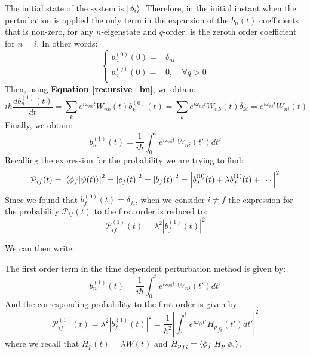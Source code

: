 The initial state of the system is $\ket{\phi_i}$. Therefore, in the initial instant when the perturbation is applied the only term in the expansion of the $b_n(t)$ coefficients that is non-zero, for any $n$-eigenstate and $q$-order, is the zeroth order coefficient for $n = i$. In other words:
\begin{equation}
    \left\{
    \begin{matrix}
        b_n^{(0)}(0) =& \delta_{ni}&\\
        b_n^{(q)}(0) =& 0,& \forall q > 0 \\
    \end{matrix}\right.
\end{equation}
Then, using \textbf{Equation \ref{recursive_bn}}, we obtain:
\begin{equation}
    i\hbar \frac{d b_n^{(1)}(t)}{dt}  = \sum_k e^{i\omega_{nk}t}W_{nk}(t)  b_k^{(0)}(t) = \sum_k e^{i\omega_{nk}t}W_{nk}(t)  \delta_{ki} = e^{i\omega_{ni}t}W_{ni}(t) 
\end{equation}
Finally, we obtain:
\begin{equation}
    b_n^{(1)}(t) = \frac{1}{i\hbar}\int_0^t e^{i\omega_{ni}t'}W_{ni}(t')dt' 
\end{equation}
Recalling the expression for the probability we are trying to find:
\begin{equation}
    \mathcal{P}_{if}(t) = \left|\braket{\phi_f|\psi(t)}\right|^2 = \left| c_f(t) \right|^2 = \left|b_f(t)\right|^2 = \left|b_f^{(0)}(t) + \lambda b_f^{(1)}(t) + \cdots\right|^2
\end{equation}
Since we found that $b_f^{(0)}(t) = \delta_{fi}$, when we consider $i\neq f$ the expression for the probability $\mathcal{P}_{if}(t)$ to the first order is reduced to:
\begin{equation}
    \mathcal{P}_{if}^{(1)}(t) = \lambda^2\left| b_f^{(1)}(t) \right|^2
\end{equation}

We can then write:
\begin{definition}
    The first order term in the time dependent perturbation method is given by:
    \begin{equation}
        b_n^{(1)}(t) = \frac{1}{i\hbar}\int_0^t e^{i\omega_{ni}t'}W_{ni}(t')dt' 
    \end{equation}
    And the corresponding probability to the first order is given by:
    \begin{equation}
        \mathcal{P}_{if}^{(1)}(t) = \lambda^2\left| b_f^{(1)}(t) \right|^2 = \frac{1}{\hbar^2}\left|\int_0^t e^{i\omega_{fi}t'}{H_p}_{fi}(t')dt' \right|^2
    \end{equation}
    where we recall that $H_p(t) = \lambda W(t)$ and ${H_p}_{fi} = \braket{\phi_f|H_p|\phi_i}$.
\end{definition}

